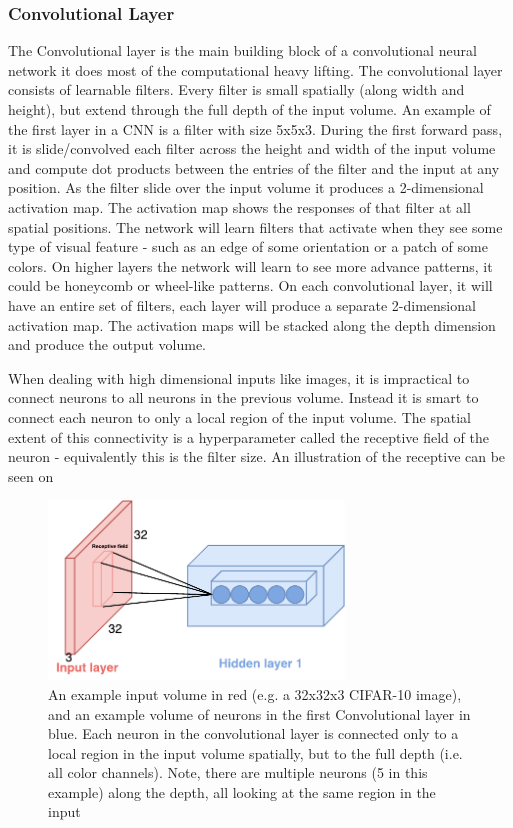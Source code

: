 \subsubsection{Convolutional Layer}
The Convolutional layer is the main building block of a convolutional neural network it does most of the computational heavy lifting. The convolutional layer consists of learnable filters. Every filter is small spatially (along width and height), but extend through the full depth of the input volume. An example of the first layer in a CNN is a filter with size 5x5x3. During the first forward pass, it is slide/convolved each filter across the height and width of the input volume and compute dot products between the entries of the filter and the input at any position. As the filter slide over the input volume it produces a 2-dimensional activation map. The activation map shows the responses of that filter at all spatial positions. The network will learn filters that activate when they see some type of visual feature - such as an edge of some orientation or a patch of some colors. On higher layers the network will learn to see more advance patterns, it could be honeycomb or wheel-like patterns. On each convolutional layer, it will have an entire set of filters, each layer will produce a separate 2-dimensional activation map. The activation maps will be stacked along the depth dimension and produce the output volume. 

When dealing with high dimensional inputs like images, it is impractical to connect neurons to all neurons in the previous volume. Instead it is smart to connect each neuron to only a local region of the input volume. The spatial extent of this connectivity is a hyperparameter called the receptive field of the neuron - equivalently this is the filter size. An illustration of the receptive can be seen on 

\begin{figure}[H]
	\centering
	\includegraphics[width=0.7\textwidth]{Figures/Respective_field.pdf}
	\caption{An example input volume in red (e.g. a 32x32x3 CIFAR-10 image), and an example volume of neurons in the first Convolutional layer in blue. Each neuron in the convolutional layer is connected only to a local region in the input volume spatially, but to the full depth (i.e. all color channels). Note, there are multiple neurons (5 in this example) along the depth, all looking at the same region in the input \cite{CNN_course}}
	\label{fig:Respective_field}
\end{figure}

